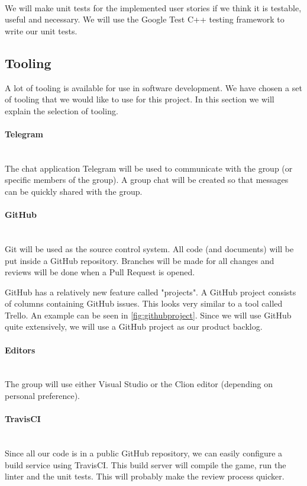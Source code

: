 ~\\

We will make unit tests for the implemented user stories if we think it is testable, useful and necessary. We will use the Google Test C++ testing framework to write our unit tests.

\subsection{Tooling}
A lot of tooling is available for use in software development. We have chosen a set of tooling that we would like to use for this project. In this section we will explain the selection of tooling.

\paragraph{Telegram}
~\\ The chat application Telegram will be used to communicate with the group (or specific members of the group). A group chat will be created so that messages can be quickly shared with the group.

\paragraph{GitHub}
~\\ Git will be used as the source control system. All code (and documents) will be put inside a GitHub repository. Branches will be made for all changes and reviews will be done when a Pull Request is opened.

GitHub has a relatively new feature called "projects". A GitHub project consists of columns containing GitHub issues. This looks very similar to a tool called Trello. An example can be seen in \cref{fig:githubproject}. Since we will use GitHub quite extensively, we will use a GitHub project as our product backlog.

\paragraph{Editors}
~\\ The group will use either Visual Studio or the Clion editor (depending on personal preference). 

\paragraph{TravisCI}
~\\ Since all our code is in a public GitHub repository, we can easily configure a build service using TravisCI. This build server will compile the game, run the linter and the unit tests. This will probably make the review process quicker.

